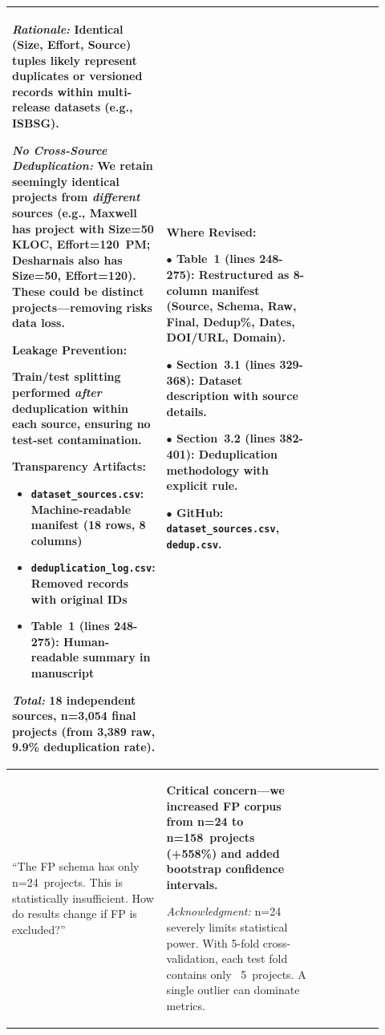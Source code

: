 \documentclass[11pt,a4paper]{article}
\begin{document}
\begin{longtable}{>{\raggedright\arraybackslash}p{0.26\linewidth}|>{\raggedright\arraybackslash}p{0.44\linewidth}|>{\raggedright\arraybackslash}p{0.22\linewidth}}
\textit{Rationale:} Identical (Size, Effort, Source) tuples likely represent duplicates or versioned records within multi-release datasets (e.g., ISBSG).

\textit{No Cross-Source Deduplication:} We retain seemingly identical projects from \textit{different} sources (e.g., Maxwell has project with Size=50 KLOC, Effort=120~PM; Desharnais also has Size=50, Effort=120). These could be distinct projects---removing risks data loss.

\textbf{Leakage Prevention:}

Train/test splitting performed \textit{after} deduplication within each source, ensuring no test-set contamination.

\textbf{Transparency Artifacts:}

\begin{itemize}
    \item \texttt{dataset\_sources.csv}: Machine-readable manifest (18 rows, 8 columns)
    \item \texttt{deduplication\_log.csv}: Removed records with original IDs
    \item Table~1 (lines 248-275): Human-readable summary in manuscript
\end{itemize}

\textit{Total:} 18 independent sources, n=3,054 final projects (from 3,389 raw, 9.9\% deduplication rate). &

\textbf{Where Revised:}

$\bullet$ \textbf{Table~1} (lines 248-275): Restructured as 8-column manifest (Source, Schema, Raw, Final, Dedup\%, Dates, DOI/URL, Domain).

$\bullet$ \textbf{Section~3.1} (lines 329-368): Dataset description with source details.

$\bullet$ \textbf{Section~3.2} (lines 382-401): Deduplication methodology with explicit rule.

$\bullet$ \textbf{GitHub}: \texttt{dataset\_sources.csv}, \texttt{dedup.csv}. \\

\midrule

``The FP schema has only n=24~projects. This is statistically insufficient. How do results change if FP is excluded?'' &

\textbf{Critical concern---we increased FP corpus from n=24 to n=158~projects (+558\%) and added bootstrap confidence intervals.}

\textit{Acknowledgment:} n=24 severely limits statistical power. With 5-fold cross-validation, each test fold contains only ~5~projects. A single outlier can dominate metrics.


\end{longtable}
\end{document}
